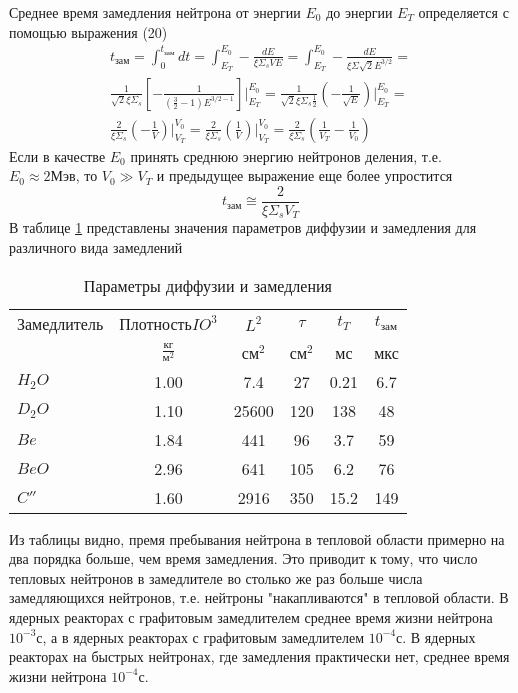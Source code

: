 \documentclass[a4paper]{article}
\begin{document}
    Среднее время замедления нейтрона от энергии $E_0$ до энергии
    $E_T$ определяется с помощью выражения (20)
    \begin{eqnarray}\nonumber
        t_\text{зам} = \int_0^{t_\text{зам}} dt =
        \int_{E_T}^{E_0} - \frac{dE}{\xi \Sigma_s VE} =
        \int_{E_T}^{E_0} - \frac{dE}{\xi\Sigma\sqrt{2}E^{3/2}} =
        \\ \nonumber
        \frac{1}{\sqrt{2}\xi\Sigma_s}
        \left[-\frac{1}{\left(\frac{3}{2}-1\right)E^{3/2-1}}\right]
        \Bigg|_{E_T}^{E_0} = \frac{1}{\sqrt{2}\xi\Sigma_s\frac{1}{2}}
        \left(-\frac{1}{\sqrt{E}}\right)\Bigg|_{E_T}^{E_0} =
        \\ \nonumber
        \frac{2}{\xi\Sigma_s}\left(-\frac{1}{V}\right)
        \Bigg|_{V_T}^{V_0}=\frac{2}{\xi\Sigma_s}
        \left(\frac{1}{V}\right)\Bigg|_{V_T}^{V_0}=
        \frac{2}{\xi\Sigma_s}\left(\frac{1}{V_T}-\frac{1}{V_0}\right)
    \end{eqnarray}
    Если в качестве $E_0$ принять среднюю энергию нейтронов деления,
    т.е. \(E_0\approx2\text{Мэв}\), то \(V_0 \gg V_T\)
    и предыдущее выражение еще более упростится
    \begin{equation}\label{e_28}\tag{28}
        t_\text{зам}\cong\frac{2}{\xi\Sigma_s V_T}
    \end{equation}
    В таблице \ref{t_1} представлены значения параметров диффузии и
    замедления для различного вида замедлений
    \begin{table}[b]\centering
        \begin{tabular}{ | l | c | c | c | c | c | }
            \hline
            Замедлитель & Плотность$IO^3$ & $L^2$ & $\tau$ & $t_T$ &
            $t_\text{зам}$ \\
            {} & $\frac{\text{кг}}{\text{м}^2}$ & $\text{см}^2$ &
            $\text{см}^2$ & мс & мкс\\
            \hline
                $H_2 O$ & 1.00 & 7.4 & 27 & 0.21 & 6.7 \\
                $D_2 O$ & 1.10 & 25600 & 120 & 138 & 48 \\
                $Be$ & 1.84 & 441 & 96 & 3.7 & 59 \\
                $BeO$ & 2.96 & 641 & 105 & 6.2 & 76 \\
                $C''$ & 1.60 & 2916 & 350 & 15.2 & 149 \\
            \hline
        \end{tabular}
        \caption{Параметры диффузии и замедления}
        \label{t_1}
    \end{table}
    Из таблицы видно, премя пребывания нейтрона в тепловой области
    примерно на два порядка больше, чем время замедления. Это
    приводит к тому, что число тепловых нейтронов в замедлителе во
    столько же раз больше числа замедляющихся нейтронов, т.е.
    нейтроны "накапливаются" в тепловой области. В ядерных реакторах
    с графитовым замедлителем среднее время жизни нейтрона
    $10^{-3}\text{с}$, а в ядерных реакторах с графитовым
    замедлителем $10^{-4}\text{с}$. В ядерных реакторах на быстрых
    нейтронах, где замедления практически нет, среднее время жизни
    нейтрона $10^{-4}\text{с}$.
\end{document}

